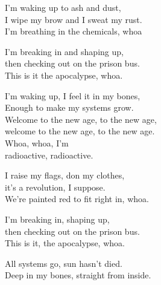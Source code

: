 
\ve{}
I’m waking up to ash and dust,\\
I wipe my brow and I sweat my rust.\\
I’m breathing in the chemicals, whoa

\ve{}
I’m breaking in and shaping up,\\
then checking out on the prison bus.\\ 
This is it the apocalypse, whoa.

\cho{} 
I’m waking up, I feel it in my bones,\\
Enough to make my systems grow.\\
Welcome to the new age, to the new age,\\
welcome to the new age, to the new age.\\
Whoa, whoa, I'm\\
radioactive, radioactive.

\ve{}
I raise my flags, don my clothes,\\
it's a revolution, I suppose.\\
We're painted red to fit right in, whoa.

\ve{}
I'm breaking in, shaping up,\\
then checking out on the prison bus.\\
This is it, the apocalypse, whoa.

\cho{}

\ve{}
All systems go, sun hasn't died.\\
Deep in my bones, straight from inside.

\cho{}

\esong